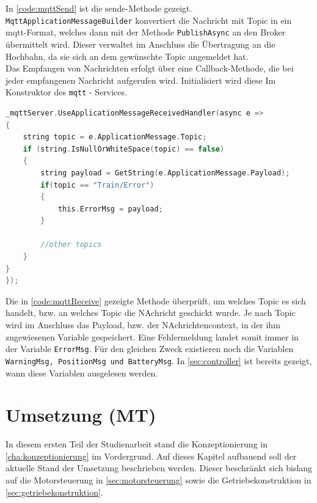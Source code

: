 \vspace{0.5cm}
In \autoref{code:mqttSend} ist die sende-Methode gezeigt. \texttt{MqttApplicationMessageBuilder} konvertiert die Nachricht mit Topic in ein \acrshort{mqtt}-Format, welches dann mit der Methode \texttt{PublishAsync} an den Broker übermittelt wird. Dieser verwaltet im Anschluss die Übertragung an die Hochbahn, da sie sich an dem gewünschte Topic angemeldet hat.\\
Das Empfangen von Nachrichten erfolgt über eine Callback-Methode, die bei jeder empfangenen Nachricht aufgerufen wird. Initialisiert wird diese Im Konstruktor des \texttt{mqtt} - Services.

\begin{lstlisting}[language=c, style=dhpaperdefault]
_mqttServer.UseApplicationMessageReceivedHandler(async e =>
{
	string topic = e.ApplicationMessage.Topic;
	if (string.IsNullOrWhiteSpace(topic) == false)
	{
		string payload = GetString(e.ApplicationMessage.Payload);
		if(topic == "Train/Error")
		{
			this.ErrorMsg = payload;
		}
		
		//other topics
	}
}
});

\end{lstlisting}
\vspace{0.5cm}

Die in \autoref{code:mqttReceive} gezeigte Methode überprüft, um welches Topic es sich handelt, bzw. an welches Topic die NAchricht geschickt wurde. Je nach Topic wird im Anschluss das Payload, bzw. der NAchrichtencontext, in der ihm zugewiesenen Variable gespeichert. Eine Fehlermeldung landet somit immer in der Variable \texttt{ErrorMsg}. Für den gleichen Zweck existieren noch die Variablen \texttt{WarningMsg, PositionMsg und BatteryMsg}. In \autoref{sec:controller} ist bereits gezeigt, wann diese Variablen ausgelesen werden. 

\chapter{Umsetzung (MT)} 
\label{cha:umsetzung}
In diesem ersten Teil der Studienarbeit stand die Konzeptionierung in \autoref{cha:konzeptionierung} im Vordergrund. Auf dieses Kapitel aufbauend soll der aktuelle Stand der Umsetzung beschrieben werden. Dieser beschränkt sich bislang auf die Motorsteuerung in \autoref{sec:motorsteuerung} sowie die Getriebekonstruktion in \autoref{sec:getriebekonstruktion}.
\newpage
 
